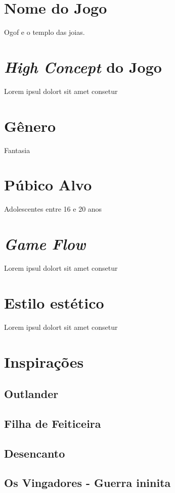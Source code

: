 \section{Nome do Jogo}
Ogof e o templo das joias.

\section{\textit{High Concept} do Jogo}

Lorem ipsul dolort sit amet consetur
\section{Gênero}
Fantasia

\section{Púbico Alvo}

Adolescentes entre 16 e 20 anos

\section{\textit{Game Flow}}

Lorem ipsul dolort sit amet consetur

\section{Estilo estético}

Lorem ipsul dolort sit amet consetur

\section{Inspirações}

\subsection{Outlander}
\subsection{Filha de Feiticeira}
\subsection{Desencanto}
\subsection{Os Vingadores - Guerra ininita}
